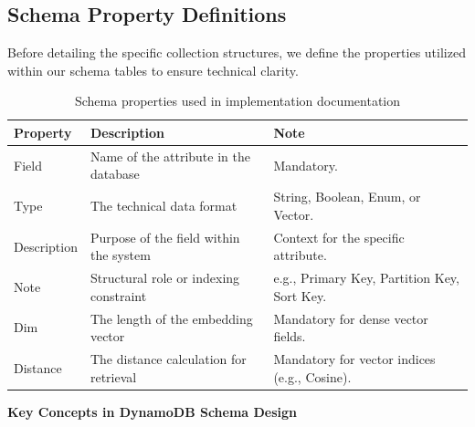 \subsection{Schema Property Definitions}
Before detailing the specific collection structures, we define the properties utilized within our schema tables to ensure technical clarity.

\begin{table}[H]
    \centering
    \begin{tabular}{llp{8cm}}
        \toprule
        \textbf{Property} & \textbf{Description} & \textbf{Note} \\
        \midrule
        Field & Name of the attribute in the database & Mandatory. \\
        Type & The technical data format & String, Boolean, Enum, or Vector. \\
        Description & Purpose of the field within the system & Context for the specific attribute. \\
        Note & Structural role or indexing constraint & e.g., Primary Key, Partition Key, Sort Key. \\
        \midrule
        Dim & The length of the embedding vector & Mandatory for dense vector fields. \\
        Distance & The distance calculation for retrieval & Mandatory for vector indices (e.g., Cosine). \\
        \bottomrule
    \end{tabular}
    \caption{Schema properties used in implementation documentation}
    \label{tab:schema_props}
\end{table}

\textbf{Key Concepts in DynamoDB Schema Design}

